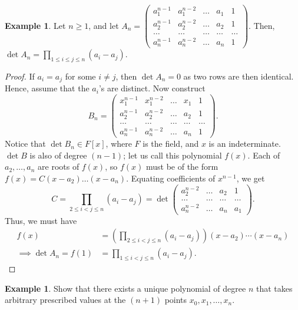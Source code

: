 \documentclass[15pt,a4paper]{book}
\theoremstyle{definition}
\newtheorem{example}[theorem]{Example}
\begin{document}
\begin{example}
    Let $n \geq 1$, and let $A_{n} = \begin{pmatrix}
        a_{1}^{n-1} & a_{1}^{n-2} & \ldots & a_{1} & 1 \\
        a_{2}^{n-1} & a_{2}^{n-2} & \ldots & a_{2} & 1 \\
        \ldots & \ldots & \ldots & \ldots & \ldots \\
        a_{n}^{n-1} & a_{n}^{n-2} & \ldots & a_{n} & 1
    \end{pmatrix}$. Then, $\det {A_{n}} = \prod \limits_{1 \leq i \leq j \leq n} (a_{i}-a_{j})$.
\end{example}
\begin{proof}
    If $a_{i}=a_{j}$ for some $i \neq j$, then $\det{A_{n}} = 0$ as two rows are then identical. Hence, assume that the $a_{i}$'s are distinct. Now construct
    \begin{equation}
        B_{n} = 
        \begin{pmatrix}
            x_{1}^{n-1} & x_{1}^{n-2} & \ldots & x_{1} & 1 \\
            a_{2}^{n-1} & a_{2}^{n-2} & \ldots & a_{2} & 1 \\
            \ldots & \ldots & \ldots & \ldots & \ldots \\
            a_{n}^{n-1} & a_{n}^{n-2} & \ldots & a_{n} & 1
        \end{pmatrix}.
    \end{equation}
    Notice that $\det B_{n} \in F[x]$, where $F$ is the field, and $x$ is an indeterminate. $\det {B}$ is also of degree $(n-1)$; let us call this polynomial $f(x)$. Each of $a_{2},\ldots,a_{n}$ are roots of $f(x)$, so $f(x)$ must be of the form $f(x) = C(x-a_{2}) \ldots (x-a_{n})$. Equating coefficients of $x^{n-1}$, we get
    \begin{equation}
        C = \prod_{2 \leq i < j \leq n} (a_{i}-a_{j}) = \det \begin{pmatrix}
            a_{2}^{n-2} & \ldots & a_{2} & 1 \\
            \ldots & \ldots & \ldots & \ldots \\
            a_{n}^{n-2} & \ldots & a_{n} & a_{1}
        \end{pmatrix}.
    \end{equation}
    Thus, we must have
    \begin{align}
        f(x) &= \left( \prod_{2 \leq i < j \leq n} (a_{i}-a_{j}) \right) (x-a_{2}) \cdots (x-a_{n}) \\
        \implies \det A_{n} = f(1) &= \prod_{1 \leq i < j \leq n} (a_{i}-a_{j}).
    \end{align}
\end{proof}
\begin{example}
    Show that there exists a unique polynomial of degree $n$ that takes arbitrary prescribed values at the $(n+1)$ points $x_{0},x_{1},\ldots,x_{n}$.
\end{example}
\end{document}
